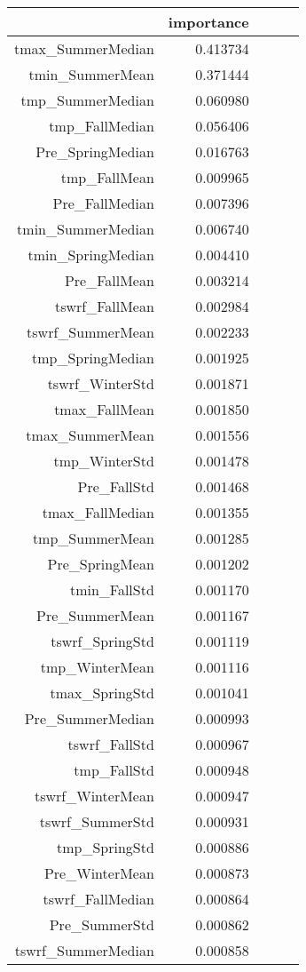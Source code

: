 \begin{tabular}{rrrrr}
\toprule
 & importance \\
\midrule
tmax_SummerMedian & 0.413734 \\
tmin_SummerMean & 0.371444 \\
tmp_SummerMedian & 0.060980 \\
tmp_FallMedian & 0.056406 \\
Pre_SpringMedian & 0.016763 \\
tmp_FallMean & 0.009965 \\
Pre_FallMedian & 0.007396 \\
tmin_SummerMedian & 0.006740 \\
tmin_SpringMedian & 0.004410 \\
Pre_FallMean & 0.003214 \\
tswrf_FallMean & 0.002984 \\
tswrf_SummerMean & 0.002233 \\
tmp_SpringMedian & 0.001925 \\
tswrf_WinterStd & 0.001871 \\
tmax_FallMean & 0.001850 \\
tmax_SummerMean & 0.001556 \\
tmp_WinterStd & 0.001478 \\
Pre_FallStd & 0.001468 \\
tmax_FallMedian & 0.001355 \\
tmp_SummerMean & 0.001285 \\
Pre_SpringMean & 0.001202 \\
tmin_FallStd & 0.001170 \\
Pre_SummerMean & 0.001167 \\
tswrf_SpringStd & 0.001119 \\
tmp_WinterMean & 0.001116 \\
tmax_SpringStd & 0.001041 \\
Pre_SummerMedian & 0.000993 \\
tswrf_FallStd & 0.000967 \\
tmp_FallStd & 0.000948 \\
tswrf_WinterMean & 0.000947 \\
tswrf_SummerStd & 0.000931 \\
tmp_SpringStd & 0.000886 \\
Pre_WinterMean & 0.000873 \\
tswrf_FallMedian & 0.000864 \\
Pre_SummerStd & 0.000862 \\
tswrf_SummerMedian & 0.000858 \\

\end{tabular}
